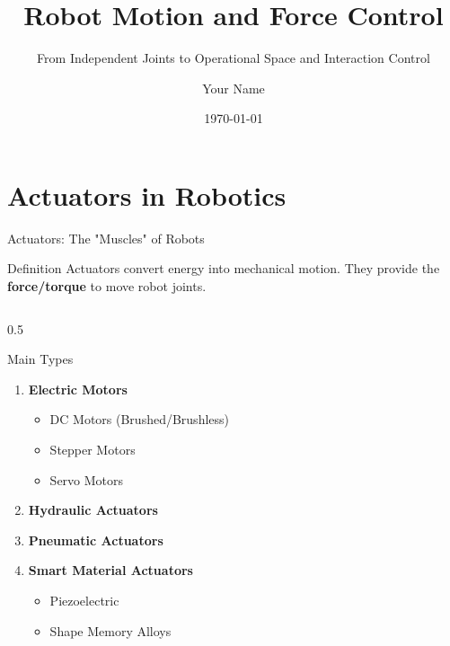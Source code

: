 \documentclass[10pt]{beamer}
\title{Robot Motion and Force Control}
\subtitle{From Independent Joints to Operational Space and Interaction Control}
\author{Your Name}
\institute{Your Institution}
\date{\today}
\begin{document}
\section{Actuators in Robotics}
\begin{frame}{Actuators: The "Muscles" of Robots}
    \begin{block}{Definition}
        Actuators convert energy into mechanical motion. They provide the \textbf{force/torque} to move robot joints.
    \end{block}
    
    \begin{columns}
        \begin{column}{0.5\textwidth}
            \begin{exampleblock}{Main Types}
                \begin{enumerate}
                    \item \textbf{Electric Motors}
                    \begin{itemize}
                        \footnotesize
                        \item DC Motors (Brushed/Brushless)
                        \item Stepper Motors
                        \item Servo Motors
                    \end{itemize}
                    \item \textbf{Hydraulic Actuators}
                    \item \textbf{Pneumatic Actuators}
                    \item \textbf{Smart Material Actuators}
                    \begin{itemize}
                        \footnotesize
                        \item Piezoelectric
                        \item Shape Memory Alloys
                    \end{itemize}
                \end{enumerate}
            \end{exampleblock}
        \end{column}
        

\end{columns}
\end{frame}
\end{document}
